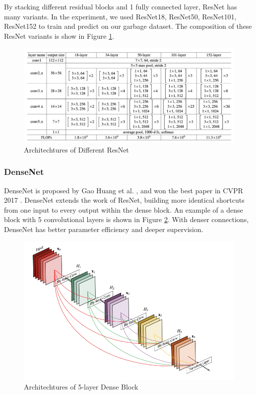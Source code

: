 By stacking different residual blocks and 1 fully connected layer, ResNet has many variants. In the experiment, we used ResNet18, ResNet50, ResNet101, ResNet152 to train and predict on our garbage dataset. The composition of these ResNet variants is show in Figure \ref{fig:res_arch}.

\begin{figure}[ht]
	\centering
	\includegraphics[width=\linewidth]{figs/resnet_arch.png}
	\caption{Architechtures of Different ResNet\cite{resnet2016}}
	\label{fig:res_arch}
\end{figure}


\subsubsection{DenseNet}
DenseNet is proposed by Gao Huang et al. \cite{densenet2017}, and won the best paper in CVPR 2017 \cite{densenet2017}. DenseNet extends the work of ResNet, building more identical shortcuts from one input to every output within the dense block. An example of a dense block with 5 convolutional layers is shown in Figure \ref{fig:dense_block}. With denser connections, DenseNet has better parameter efficiency and deeper supervision.

\begin{figure}[ht]
	\centering
	\includegraphics[width=\linewidth]{figs/dense_block.png}
	\caption{Architechtures of 5-layer Dense Block\cite{densenet2017}}
	\label{fig:dense_block}
\end{figure}


